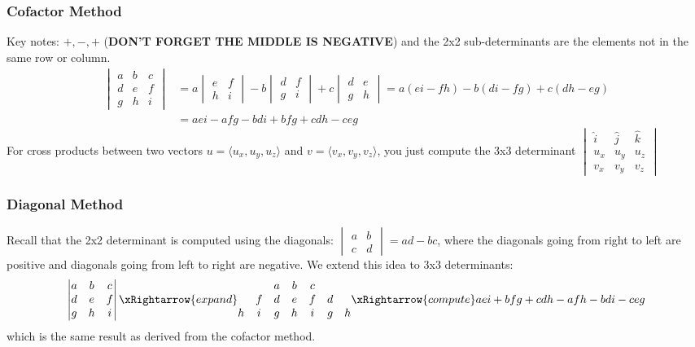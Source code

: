\documentclass[]{mangos-musings}
\begin{document}
\subsubsection{Cofactor Method}
Key notes: $+, -, +$ (\textbf{DON'T FORGET THE MIDDLE IS NEGATIVE}) and the 2x2 sub-determinants are the elements not in the same row or column.
\begin{align*}
  \begin{vmatrix}
    a & b & c \\
    d & e & f \\ 
    g & h & i
  \end{vmatrix}
  &= a \begin{vmatrix}
    e & f \\ 
    h & i
  \end{vmatrix}
  - b \begin{vmatrix}
    d & f \\ 
    g & i
  \end{vmatrix}
  + c \begin{vmatrix}
    d & e \\ 
    g & h
  \end{vmatrix}
  = a(ei - fh) - b(di - fg) + c(dh - eg)
  \\ &= aei - afg - bdi + bfg + cdh - ceg
\end{align*}
For cross products between two vectors $u = \langle u_x, u_y, u_z \rangle$ and $v = \langle v_x, v_y, v_z \rangle$, you just compute the 3x3 determinant $\begin{vmatrix}
  \hat{i} & \hat{j} & \hat{k} \\ 
  u_x & u_y & u_z \\ 
  v_x & v_y & v_z
\end{vmatrix}$

\subsubsection{Diagonal Method}
Recall that the 2x2 determinant is computed using the diagonals:
$\begin{vmatrix}
    a & b \\
    c & d 
\end{vmatrix} = ad - bc$, where the diagonals going from right to left are positive and diagonals going from left to right are negative. We extend this idea to 3x3 determinants:
\[\begin{vmatrix}
    a & b & c \\
    d & e & f \\ 
    g & h & i
  \end{vmatrix} \xRightarrow{expand} \begin{matrix}
    & & a & b & c & & \\
    & f & d & e & f & d & \\ 
    h & i & g & h & i & g & h
  \end{matrix} \xRightarrow{compute} aei + bfg + cdh - afh - bdi - ceg\]
which is the same result as derived from the cofactor method.
\end{document}
